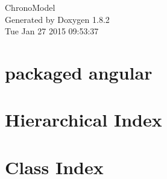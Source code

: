 \documentclass{book}
\begin{document}
\hypersetup{pageanchor=false,citecolor=blue}
\begin{titlepage}
\vspace*{7cm}
\begin{center}
{\Large Chrono\-Model }\\
\vspace*{1cm}
{\large Generated by Doxygen 1.8.2}\\
\vspace*{0.5cm}
{\small Tue Jan 27 2015 09:53:37}\\
\end{center}
\end{titlepage}
\clearemptydoublepage
{}
\tableofcontents
\clearemptydoublepage
{}
\hypersetup{pageanchor=true,citecolor=blue}
\chapter{packaged angular}
\label{md_README}
\hypertarget{md_README}{}

\chapter{Hierarchical Index}

\chapter{Class Index}

\end{document}
